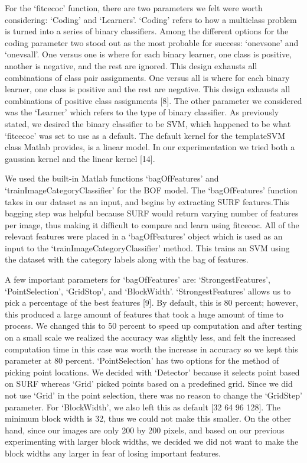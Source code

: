 \documentclass[conference]{IEEEtran}
\begin{document}
For the ‘fitcecoc’ function, there are two parameters we felt were worth considering: ‘Coding’ and ‘Learners’. ‘Coding’ refers to how a multiclass problem is turned into a series of binary classifiers. Among the different options for the coding parameter two stood out as the most probable for success: ‘onevsone’ and ‘onevsall’. One versus one is where for each binary learner, one class is positive, another is negative, and the rest are ignored. This design exhausts all combinations of class pair assignments. One versus all is where for each binary learner, one class is positive and the rest are negative. This design exhausts all combinations of positive class assignments [8]. The other parameter we considered was the ‘Learner’ which refers to the type of binary classifier. As previously stated, we desired the binary classifier to be SVM, which happened to be what ‘fitcecoc’ was set to use as a default. The default kernel for the templateSVM class Matlab provides, is a linear model. In our experimentation we tried both a gaussian kernel and the linear kernel [14].

We used the built-in Matlab functions ‘bagOfFeatures’ and ‘trainImageCategoryClassifier’ for the BOF model. The ‘bagOfFeatures’ function takes in our dataset as an input, and begins by extracting SURF features.This bagging step was helpful because SURF would return varying number of features per image, thus making it difficult to compare and learn using fitcecoc. All of the relevant features were placed in a ‘bagOfFeatures’ object which is used as an input to the ‘trainImageCategoryClassifier’ method. This trains an SVM using the dataset with the category labels along with the bag of features. 

A few important parameters for ‘bagOfFeatures’ are: ‘StrongestFeatures’, ‘PointSelection’, ‘GridStop’, and ‘BlockWidth’. ‘StrongestFeatures’ allows us to pick a percentage of the best features [9]. By default, this is 80 percent; however, this produced a large amount of features that took a huge amount of time to process. We changed this to 50 percent to speed up computation and after testing on a small scale we realized the accuracy was slightly less, and felt the increased computation time in this case was worth the increase in accuracy so we kept this parameter at 80 percent. ‘PointSelection’ has two options for the method of picking point locations. We decided with ‘Detector’ because it selects point based on SURF whereas ‘Grid’ picked points based on a predefined grid. Since we did not use ‘Grid’ in the point selection, there was no reason to change the ‘GridStep’ parameter. For ‘BlockWidth’, we also left this as default [32 64 96 128]. The minimum block width is 32, thus we could not make this smaller. On the other hand, since our images are only 200 by 200 pixels, and based on our previous experimenting with larger block widths, we decided we did not want to make the block widths any larger in fear of losing important features.
\end{document}
